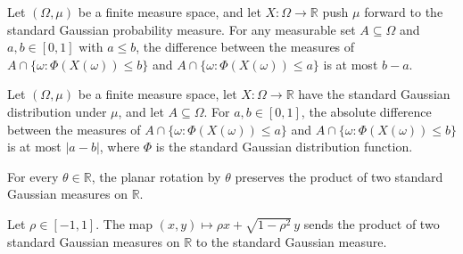 \begin{lemma}
\label{BooleanAnalysis.GaussianSpace.measureReal_standardGaussianCDF_inter_sub_le}
\leanok
{}
Let $(\Omega,\mu)$ be a finite measure space, and let $X:\Omega\to\mathbb R$ push $\mu$
forward to the standard Gaussian probability measure. For any measurable set
$A\subseteq\Omega$ and $a,b\in[0,1]$ with $a\le b$, the difference between the measures
of $A\cap\{\omega:\Phi(X(\omega))\le b\}$ and $A\cap\{\omega:\Phi(X(\omega))\le a\}$ is
at most $b-a$.
\end{lemma}

\begin{lemma}
\label{BooleanAnalysis.GaussianSpace.abs_measureReal_standardGaussianCDF_inter_sub_le}
\leanok
{}
Let $(\Omega,\mu)$ be a finite measure space, let $X\colon\Omega\to\mathbb R$ have the
standard Gaussian distribution under $\mu$, and let $A\subseteq\Omega$. For
$a,b\in[0,1]$, the absolute difference between the measures of
$A\cap\{\omega:\Phi(X(\omega))\le a\}$ and $A\cap\{\omega:\Phi(X(\omega))\le b\}$ is at
most $|a-b|$, where $\Phi$ is the standard Gaussian distribution function.
\end{lemma}

\begin{lemma}
\label{BooleanAnalysis.GaussianSpace.measurePreserving_scalarGaussianRotation}
\leanok
{}
For every $\theta\in\mathbb R$, the planar rotation by $\theta$ preserves the product of
two standard Gaussian measures on $\mathbb R$.
\end{lemma}

\begin{lemma}
\label{BooleanAnalysis.GaussianSpace.measurePreserving_scalarGaussianEndpoint}
\leanok
{}
Let $\rho\in[-1,1]$. The map $(x,y)\mapsto\rho x+\sqrt{1-\rho^2}\,y$ sends the product
of two standard Gaussian measures on $\mathbb R$ to the standard Gaussian measure.
\end{lemma}


